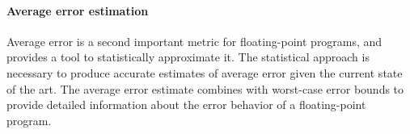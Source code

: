 \documentclass[main.tex]{subfiles}
\begin{document}
\paragraph{Average error estimation}
Average error is a second important metric for floating-point programs,
  and \name provides a tool to statistically approximate it.
The statistical approach is necessary to produce accurate estimates
  of average error given the current state of the art.
The average error estimate combines with worst-case error bounds
  to provide detailed information about the error behavior
  of a floating-point program.
\end{document}
